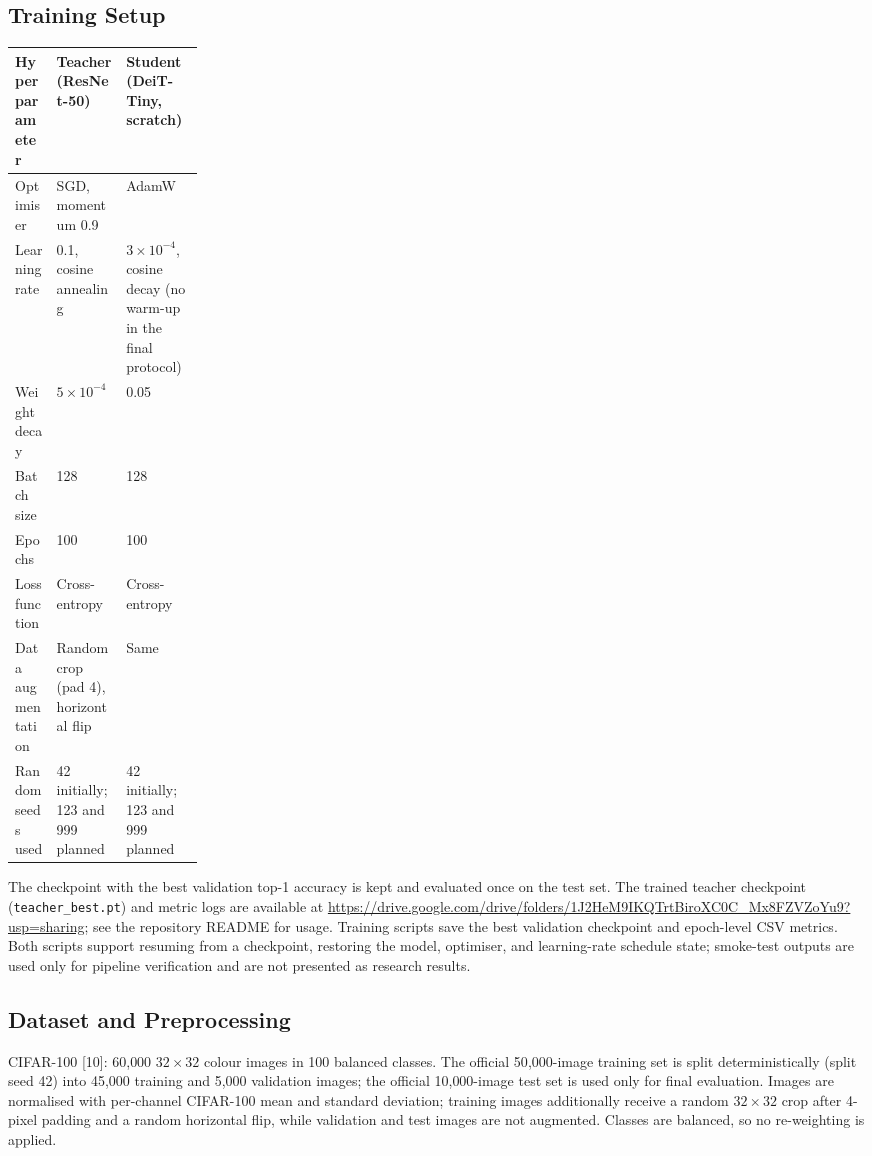 \documentclass[11pt, letterpaper]{article}
\begin{document}
\subsection{Training Setup}

{\small
\begin{tabularx}{\linewidth}{@{}p{0.22\linewidth}XX@{}}
\toprule
\textbf{Hyperparameter} & \textbf{Teacher (ResNet-50)} & \textbf{Student (DeiT-Tiny, scratch)} \\
\midrule
Optimiser & SGD, momentum 0.9 & AdamW \\
Learning rate & 0.1, cosine annealing & $3\times10^{-4}$, cosine decay (no warm-up in the final protocol) \\
Weight decay & $5\times10^{-4}$ & 0.05 \\
Batch size & 128 & 128 \\
Epochs & 100 & 100 \\
Loss function & Cross-entropy & Cross-entropy \\
Data augmentation & Random crop (pad 4), horizontal flip & Same \\
Random seeds used & 42 initially; 123 and 999 planned & 42 initially; 123 and 999 planned \\
\bottomrule
\end{tabularx}
}

The checkpoint with the best validation top-1 accuracy is kept and evaluated
once on the test set. The trained teacher checkpoint
(\texttt{teacher\_best.pt}) and metric logs are available at
\url{https://drive.google.com/drive/folders/1J2HeM9IKQTrtBiroXC0C_Mx8FZVZoYu9?usp=sharing};
see the repository README for usage. Training scripts save the best validation
checkpoint and epoch-level CSV metrics. Both scripts support resuming from a
checkpoint, restoring the model, optimiser, and learning-rate schedule state;
smoke-test outputs are used only for pipeline verification and are not
presented as research results.

\subsection{Dataset and Preprocessing}

CIFAR-100 [10]: 60{,}000 $32\times32$ colour images in 100 balanced classes.
The official 50{,}000-image training set is split deterministically (split seed
42) into 45{,}000 training and 5{,}000 validation images; the official
10{,}000-image test set is used only for final evaluation. Images are
normalised with per-channel CIFAR-100 mean and standard deviation; training
images additionally receive a random $32\times32$ crop after 4-pixel padding
and a random horizontal flip, while validation and test images are not
augmented. Classes are balanced, so no re-weighting is applied.
\end{document}
